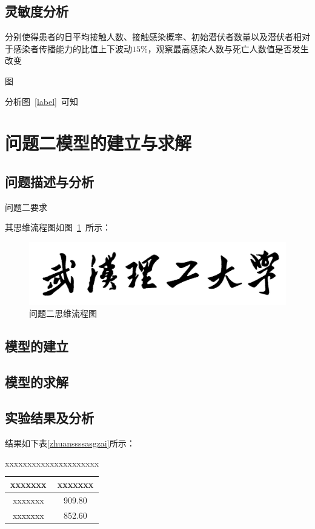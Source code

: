 \documentclass{whutmod}
\begin{document}
\begin{table}[H]
        	
        \subsection{灵敏度分析}
        分别使得患者的日平均接触人数、接触感染概率、初始潜伏者数量以及潜伏者相对于感染者传播能力的比值上下波动$15\%$，观察最高感染人数与死亡人数值是否发生改变
        
        图
        
        分析图~\ref{label}~可知
       
        \end{table}
        
  
	\section{问题二模型的建立与求解}
		\subsection{问题描述与分析}
			问题二要求

    		其思维流程图如图~\ref{lssssct}~所示：

			\begin{figure}[H]
				\centering
				\includegraphics[width=\textwidth]{figures/whut.jpg}
				\caption{问题二思维流程图}\label{lssssct}
			\end{figure}

		\subsection{模型的建立}
		
		\subsection{模型的求解}
	
		
             
        \subsection{实验结果及分析}
        
			结果如下表\ref{zhuanssssasgzai}所示：
			\begin{table}[H]
			\centering		
			\caption{xxxxxxxxxxxxxxxxxxxxx}\label{biao1}
			\begin{tabular}{cc}
			\toprule[2pt]
				\multicolumn{1}{m{5cm}}{\centering xxxxxxx}
				& \multicolumn{1}{m{5cm}}{\centering xxxxxxx}
				\\
				\midrule[1pt]
				xxxxxxx &   909.80\\ 
				xxxxxxx & 	852.60\\ 
			\bottomrule[2pt]	
			\end{tabular}
			\end{table}
  
\end{document}
